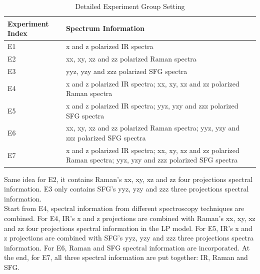 
\begin{table}\tiny \label{tab:5.1} 
\begin{center}
\begin{tabular}{| l | l | l  }
\hline
Experiment Index & Spectrum Information \\
\hline
E1 & x and z polarized IR spectra\\
\hline
E2 & xx, xy, xz and zz polarized Raman spectra \\
\hline
E3 & yyz, yzy and zzz polarized SFG spectra \\
\hline
E4 & x and z polarized IR spectra; xx, xy, xz and zz polarized Raman spectra \\
\hline
E5 & x and z polarized IR spectra; yyz, yzy and zzz polarized SFG spectra   \\
\hline
E6 & xx, xy, xz and zz polarized Raman spectra; yyz, yzy and zzz polarized SFG spectra \\
\hline
E7 & x and z polarized IR spectra; xx, xy, xz and zz polarized Raman spectra; yyz, yzy and zzz polarized SFG spectra \\
\hline
\end{tabular} 
\end{center}
\caption{Detailed Experiment Group Setting} 
\end{table}	



Same idea for E2, it contains Raman's xx, xy, xz and zz four projections spectral information. E3 only contains SFG's yyz, yzy and zzz three projections spectral information. \\

Start from E4, spectral information from different spectroscopy techniques are combined. For E4, IR's x and z projections are combined with Raman's xx, xy, xz and zz four projections spectral information in the LP model. For E5, IR's x and z projections are combined with SFG's yyz, yzy and zzz three projections spectra information. For E6, Raman and SFG spectral information are incorporated. At the end, for E7, all three spectral information are put together: IR, Raman and SFG. \\

